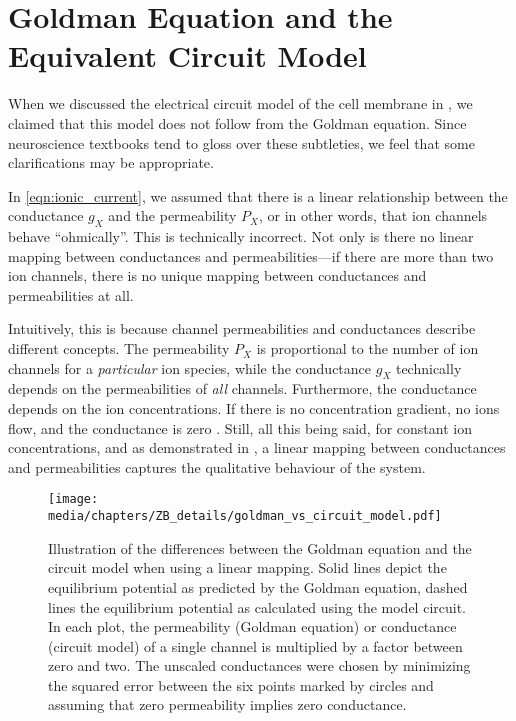 \section{Goldman Equation and the Equivalent Circuit Model}
\label{app:goldman_equiv_circuit_diff}

When we discussed the electrical circuit model of the cell membrane in , we claimed that this model does not follow from the Goldman equation.
Since neuroscience textbooks tend to gloss over these subtleties, we feel that some clarifications may be appropriate.

In \cref{eqn:ionic_current}, we assumed that there is a linear relationship between the conductance $g_X$ and the permeability $P_X$, or in other words, that ion channels behave \enquote{ohmically}.
This is technically incorrect.
Not only is there no linear mapping between conductances and permeabilities---if there are more than two ion channels, there is no unique mapping between conductances and permeabilities at all.

Intuitively, this is because channel permeabilities and conductances describe different concepts.
The permeability $P_X$ is proportional to the number of ion channels for a \emph{particular} ion species, while the conductance $g_X$ technically depends on the permeabilities of \emph{all} channels.
Furthermore, the conductance depends on the ion concentrations.
If there is no concentration gradient, no ions flow, and the conductance is zero \citep{enderle2011bioelectric}.
Still, all this being said, for constant ion concentrations, and as demonstrated in , a linear mapping between conductances and permeabilities captures the qualitative behaviour of the system.

\begin{figure}
	\centering
	\texttt{[image: media/chapters/ZB\_details/goldman\_vs\_circuit\_model.pdf]}
	\caption[Differences between the Goldman equation and the circuit model]{Illustration of the differences between the Goldman equation and the circuit model when using a linear mapping. Solid lines depict the equilibrium potential as predicted by the Goldman equation, dashed lines the equilibrium potential as calculated using the model circuit. In each plot, the permeability (Goldman equation) or conductance (circuit model) of a single channel is multiplied by a factor between zero and two. The unscaled conductances were chosen by minimizing the squared error between the six points marked by circles and assuming that zero permeability implies zero conductance.}
	\label{fig:goldman_vs_circuit_model}
\end{figure}

